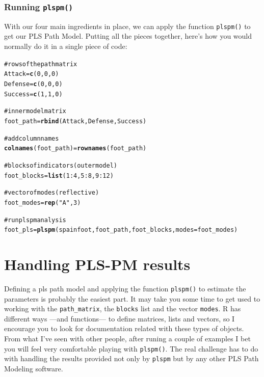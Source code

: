 \documentclass[12pt]{book}\usepackage{graphicx, color}
\makeatletter
\newcommand{\hlfunctioncall}[1]{\textcolor[rgb]{0.501960784313725,0,0.329411764705882}{\textbf{#1}}}%
\newcommand{\hlstring}[1]{\textcolor[rgb]{0.6,0.6,1}{#1}}%
\newcommand{\hlcomment}[1]{\textcolor[rgb]{0.180392156862745,0.6,0.341176470588235}{#1}}%
\newenvironment{kframe}{%
 \def\at@end@of@kframe{}%
 \ifinner\ifhmode%
  \def\at@end@of@kframe{\end{minipage}}%
  \begin{minipage}{\columnwidth}%
 \fi\fi%
 \def\FrameCommand##1{\hskip\@totalleftmargin \hskip-\fboxsep
 \colorbox{shadecolor}{##1}\hskip-\fboxsep
     \hskip-\linewidth \hskip-\@totalleftmargin \hskip\columnwidth}%
 \MakeFramed {\advance\hsize-\width
   \@totalleftmargin\z@ \linewidth\hsize
   \@setminipage}}%
 {\par\unskip\endMakeFramed%
 \at@end@of@kframe}
\newenvironment{knitrout}{}{} %
\newcommand{\plspm}{\texttt{plspm}}
\newcommand{\fplspm}{\texttt{plspm()}}
\newcommand{\code}[1]{\texttt{#1}}
\makeatother
\begin{document}
\subsubsection*{Running \fplspm{}}
With our four main ingredients in place, we can apply the function \fplspm{} to get our PLS Path Model. Putting all the pieces together, here's how you would normally do it in a single piece of code:
\begin{knitrout}
\color{fgcolor}\begin{kframe}
\begin{alltt}
\hlcomment{# rows of the path matrix}
Attack = \hlfunctioncall{c}(0, 0, 0)
Defense = \hlfunctioncall{c}(0, 0, 0)
Success = \hlfunctioncall{c}(1, 1, 0)

\hlcomment{# inner model matrix}
foot_path = \hlfunctioncall{rbind}(Attack, Defense, Success)

\hlcomment{# add column names}
\hlfunctioncall{colnames}(foot_path) = \hlfunctioncall{rownames}(foot_path)

\hlcomment{# blocks of indicators (outer model)}
foot_blocks = \hlfunctioncall{list}(1:4, 5:8, 9:12)

\hlcomment{# vector of modes (reflective)}
foot_modes = \hlfunctioncall{rep}(\hlstring{"A"}, 3)

\hlcomment{# run plspm analysis}
foot_pls = \hlfunctioncall{plspm}(spainfoot, foot_path, foot_blocks, modes = foot_modes)
\end{alltt}
\end{kframe}
\end{knitrout}





\section{Handling PLS-PM results}
Defining a pls path model and applying the function \fplspm{} to estimate the parameters is probably the easiest part. It may take you some time to get used to working with the \code{path\_matrix}, the \code{blocks} list and the vector \code{modes}. R has different ways ---and functions--- to define matrices, lists and vectors, so I encourage you to look for documentation related with these types of objects. From what I've seen with other people, after runing a couple of examples I bet you will feel very comfortable playing with \fplspm{}. The real challenge has to do with handling the results provided not only by \plspm{} but by any other PLS Path Modeling software. 
\end{document}
